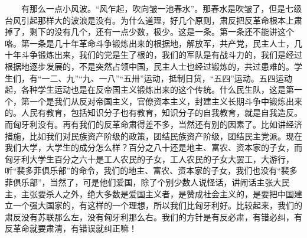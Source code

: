 \documentclass[cn,11pt,chinese]{elegantbook}
\begin{document}
　　有那么一点小风波。“风乍起，吹向皱一池春水”。那春水是吹皱了，但是七级台风引起那样大的波浪是没有。为什么道理，好几个原则，肃反把反革命根本上肃掉了，剩下的没有几个，还有一点少数，极少。这是一条。第一条还不能讲这个咯。第一条是几十年革命斗争锻炼出来的根据地，解放军，共产党，民主人士，几十年斗争锻炼出来，我们的党是生了根的，我们的军队是有战斗力的，我们是经过根据地逐步发展的，不是突然占领中国，民主人士也经过锻炼的，共过患难的。学生们，有“一二、九”“九、一八”“五卅”运动，抵制日货，“五四”运动。五四运动起，各种学生运动也是在反帝国主义锻炼出来的这个传统。什么民生队，这是第一个，第一个是我们从反对帝国主义，官僚资本主义，封建主义长期斗争中锻炼出来的。人民有教育，包括知识分子也有教育，知识分子的自我教育，就是自我造反。而匈牙利没有。再有我们的反革命肃得差不多，当然还有别的因素了。比如讲经济措施，比如我们对民族资产阶级的政策，团结民族资产阶级，团结民主党派。现在我们大学，大学生的成分怎么样？百分之八十还是地主、富农、资本家的子女，而匈牙利大学生百分之六十是工人农民的子女，工人农民的子女大罢工，大游行，听“裴多菲俱乐部”的命令，我们的地主、富农、资本家的子女，我们也没有“裴多菲俱乐部”，当然了，可是他们爱国，除了个别少数人说怪话，讲闹话主张大民主，主张要杀人之外，绝大多数是爱国主义者，是赞成社会主义的，是要把中国建立一个强大国家的，有这样的一个理想，所以我们比匈牙利好。比较起来，我们的肃反没有苏联那么左，没有匈牙利那么右。我们的方针是有反必肃，有错必纠，有反革命就要肃清，有错误就纠正嘛！\\
\end{document}
